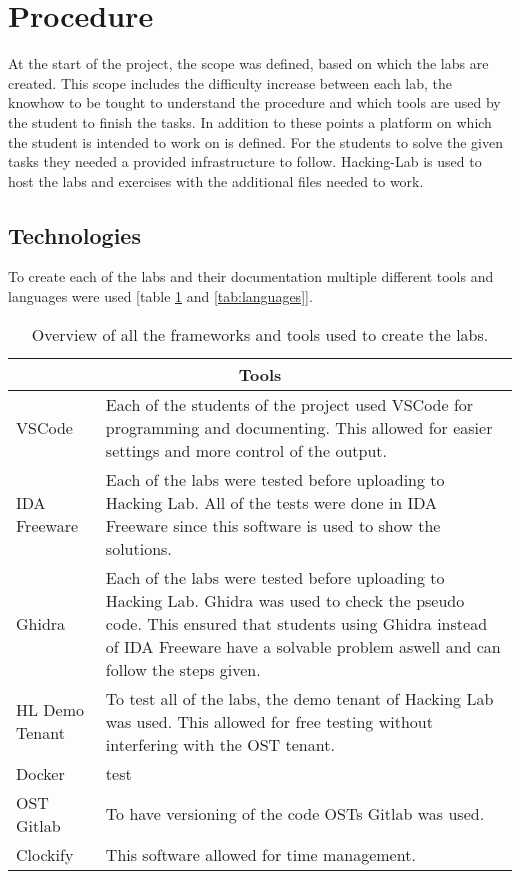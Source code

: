 \section{Procedure}
At the start of the project, the scope was defined, based on which the labs are created. This scope includes the difficulty increase between each lab, the knowhow to be tought to understand the procedure and which tools are used by the student to finish the tasks. In addition to these points a platform on which the student is intended to work on is defined.
For the students to solve the given tasks they needed a provided infrastructure to follow. Hacking-Lab is used to host the labs and exercises with the additional files needed to work.

\subsection{Technologies}
To create each of the labs and their documentation multiple different tools and languages were used [table \ref{tab:tools} and \ref{tab:languages}]. 
\begin{center}
    \begin{table}[H]
        \centering
        \begin{tabular}{ |p{4.1cm}|p{10cm}| } 
            \hline
            \multicolumn{2}{||c||}{\textbf{Tools}} \\
            \hline
            \hline
                VSCode & Each of the students of the project used VSCode for programming and documenting. This allowed for easier settings and more control of the output. \\
            \hline
                IDA Freeware & Each of the labs were tested before uploading to Hacking Lab. All of the tests were done in IDA Freeware since this software is used to show the solutions.  \\
            \hline
                Ghidra & Each of the labs were tested before uploading to Hacking Lab. Ghidra was used to check the pseudo code. This ensured that students using Ghidra instead of IDA Freeware have a solvable problem aswell and can follow the steps given. \\
            \hline
                HL Demo Tenant & 
                To test all of the labs, the demo tenant of Hacking Lab was used. This allowed for free testing without interfering with the OST tenant.  \\ 
            \hline
                Docker & test \\
            \hline
                OST Gitlab & 
                To have versioning of the code OSTs Gitlab was used.  \\ 
            \hline
                Clockify & 
                This software allowed for time management. \\ 
            \hline
        \end{tabular}
        \caption{Overview of all the frameworks and tools used to create the labs.}
        \label{tab:tools}
    \end{table}
\end{center}


